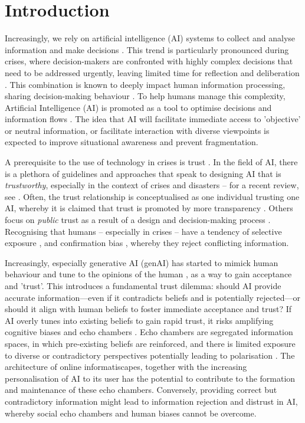 \documentclass[pdflatex,sn-apa]{sn-jnl}%
\begin{document}
\section{Introduction}\label{sec1}
Increasingly, we rely on artificial intelligence (AI) systems to collect and analyse information and make decisions \citep{klingbeil2024trust}. This trend is particularly pronounced during crises, where decision-makers are confronted with highly complex decisions that need to be addressed urgently, leaving limited time for reflection and deliberation \citep{mendonca2001decision}. This combination is known to deeply impact human information processing, sharing decision-making behaviour \citep{comes2020coordination}. To help humans manage this complexity, Artificial Intelligence (AI) is promoted as a tool to optimise decisions and information flows \citep{jeon2024hearhere}. The idea that AI will facilitate immediate access to 'objective' or neutral information, or facilitate interaction with diverse viewpoints is expected to improve situational awareness and prevent fragmentation. 

A prerequisite to the use of technology in crises is trust \citep{steinbrink2024impact}. In the field of AI, there is a plethora of guidelines and approaches that speak to designing AI that is \textit{trustworthy}, especially in the context of crises and disasters -- for a recent review, see \citep{albahri2024systematic}. Often, the trust relationship is conceptualised as one individual trusting one AI, whereby it is claimed that trust is promoted by more transparency \citep{visave2025transparency}. Others focus on \textit{public} trust as a result of a design and decision-making process \citep{tzachor2020artificial}. Recognising that humans -- especially in crises -- have a tendency of selective exposure \citep{barbera2015tweeting}, and confirmation bias \citep{paulus2024interplay}, whereby they reject conflicting information. 

Increasingly, especially generative AI (genAI) has started to mimick human behaviour and tune to the opinions of the human \citep{sharma2024generative}, as a way to gain acceptance and 'trust'. This introduces a fundamental trust dilemma: should AI provide accurate information—even if it contradicts beliefs and is potentially rejected—or should it align with human beliefs to foster immediate acceptance and trust? If AI overly tunes into existing beliefs to gain rapid trust, it risks amplifying cognitive biases and echo chambers \citep{ekstrom2022self}. Echo chambers are segregated information spaces, in which pre-existing beliefs are reinforced, and there is limited exposure to diverse or contradictory perspectives potentially leading to polarisation \citep{jeon2024hearhere}. The architecture of online informatiscapes, together with the increasing personalisation of AI to its user has the potential to contribute to the formation and maintenance of these echo chambers. Conversely, providing correct but contradictory information might lead to information rejection and distrust in AI, whereby social echo chambers and human biases cannot be overcome.
\end{document}

